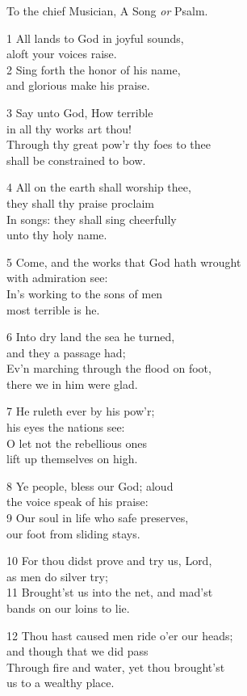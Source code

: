 \begin{multicols}{3}
To the chief Musician,
A Song \emph{or} Psalm.

1 All lands to God in joyful sounds,\\
aloft your voices raise.\\
2 Sing forth the honor of his name,\\
and glorious make his praise.

3 Say unto God, How terrible\\
in all thy works art thou!\\
Through thy great pow’r thy foes to thee\\
shall be constrained to bow.

4 All on the earth shall worship thee,\\
they shall thy praise proclaim\\
In songs: they shall sing cheerfully\\
unto thy holy name.

5 Come, and the works that God hath wrought\\
with admiration see:\\
In’s working to the sons of men\\
most terrible is he.

6 Into dry land the sea he turned,\\
and they a passage had;\\
Ev’n marching through the flood on foot,\\
there we in him were glad.

7 He ruleth ever by his pow’r;\\
his eyes the nations see:\\
O let not the rebellious ones\\
lift up themselves on high.

8 Ye people, bless our God; aloud\\
the voice speak of his praise:\\
9 Our soul in life who safe preserves,\\
our foot from sliding stays.

10 For thou didst prove and try us, Lord,\\
as men do silver try;\\
11 Brought’st us into the net, and mad’st\\
bands on our loins to lie.

12 Thou hast caused men ride o’er our heads;\\
and though that we did pass\\
Through fire and water, yet thou brought’st\\
us to a wealthy place.


\end{multicols}
